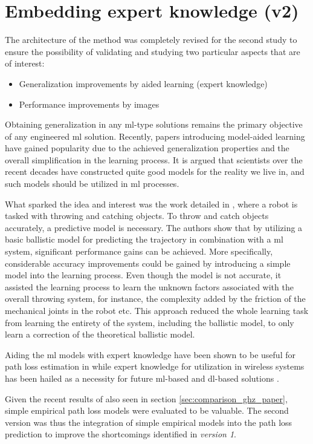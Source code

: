 \section{Embedding expert knowledge (v2)}
The architecture of the method was completely revised for the second study to ensure the possibility of validating and studying two particular aspects that are of interest:

\begin{itemize}
    \item Generalization improvements by aided learning (expert knowledge)
    \item Performance improvements by images
\end{itemize}

Obtaining generalization in any \gls{ml}-type solutions remains the primary objective of any engineered \gls{ml} solution. Recently, papers introducing model-aided learning have gained popularity due to the achieved generalization properties and the overall simplification in the learning process. It is argued that scientists over the recent decades have constructed quite good models for the reality we live in, and such models should be utilized in \gls{ml} processes. 

What sparked the idea and interest was the work detailed in \cite{Zheng2016}, where a robot is tasked with throwing and catching objects. To throw and catch objects accurately, a predictive model is necessary. The authors show that by utilizing a basic ballistic model for predicting the trajectory in combination with a \gls{ml} system, significant performance gains can be achieved. More specifically, considerable accuracy improvements could be gained by introducing a simple model into the learning process. Even though the model is not accurate, it assisted the learning process to learn the unknown factors associated with the overall throwing system, for instance, the complexity added by the friction of the mechanical joints in the robot etc. This approach reduced the whole learning task from learning the entirety of the system, including the ballistic model, to only learn a correction of the theoretical ballistic model.

Aiding the \gls{ml} models with expert knowledge have been shown to be useful for path loss estimation in \cite{Cavalcanti2017} while expert knowledge for utilization in wireless systems has been hailed as a necessity for future \gls{ml}-based and \gls{dl}-based solutions \cite{Zappone2019}.

Given the recent results of \cite{Thrane2019ComparisonGHz} also seen in section \ref{sec:comparison_ghz_paper}, simple empirical path loss models were evaluated to be valuable. The second version was thus the integration of simple empirical models into the path loss prediction to improve the shortcomings identified in \emph{version 1}. 


